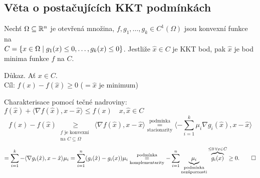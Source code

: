 \subsection{Věta o postačujících KKT podmínkách}
Nechť $\Omega \subseteq \mathbb{R}^n$ je otevřená množina, $f, g_1, \dots, g_k \in C^1(\Omega)$ jsou konvexní funkce na \\
$C = \left\lbrace x \in \Omega \mid g_1(x) \leq 0, \dots, g_k(x) \leq 0 \right\rbrace$. Jestliže $\hat x \in C$ je KKT bod, pak $\hat x$ je 
bod minima funkce $f$ na $C$.

Důkaz. Ať $x \in C$. \\
Cíl: $f(x) - f(\hat x) \geq 0$ ($= \hat x$ je minimum)

Charakterisace pomocí tečné nadroviny: $f(\hat x) + \langle \nabla f(\hat x), x - \hat x\rangle \leq f(x) \quad x, 
\hat x \in C$
\[
    f(x) - f(\hat x) \underset{\substack{\text{$f$ je konvexní } \\ \text{na $C \subseteq \Omega$}} }{\geq} \langle 
    \nabla f(\hat x), x - \hat x\rangle \underset{\text{stacionarity}}{\overset{\text{podmínka}}{=}} 
    \langle - \sum_{i=1}^{k} \mu_i \nabla g_i(\hat x), x - \hat x\rangle
\]
\[
    = \sum_{i=1}^{k} - \langle \nabla g_i(\hat x), x - \hat x \rangle \mu_i = \sum_{i=1}^{n} (g_i(\hat x) - g_i(x)) \mu_i 
    \underset{\text{komplementarity}}{\overset{\text{podmínka}}{=}} - \sum_{i=1}^{n}    
    \underbrace{\mu_i}_{\substack{\text{podmínka}\\ \text{nezápornosti}}} \overbrace{g_i(x)}^{\leq 0 \, \forall x \in C}
    \geq 0. \qed
\]
\newpage
